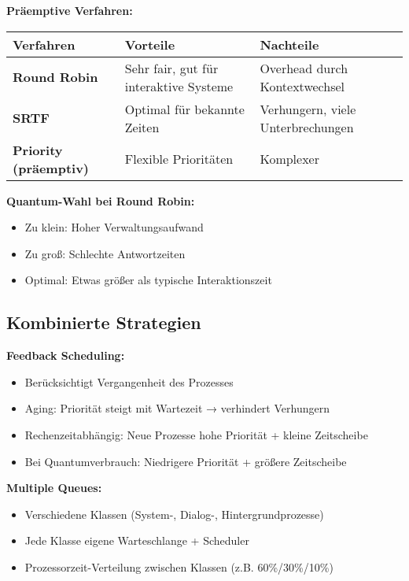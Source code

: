 \documentclass[9pt,a4paper]{extarticle}
\begin{document}
\begin{multicols*}{2}
\textbf{Präemptive Verfahren:}

\begin{center}
\begin{tabular}{|p{2.2cm}|p{2.8cm}|p{2.8cm}|}
\hline
\textbf{Verfahren} & \textbf{Vorteile} & \textbf{Nachteile} \\
\hline
\textbf{Round Robin} & Sehr fair, gut für interaktive Systeme & Overhead durch Kontextwechsel \\
\hline
\textbf{SRTF} & Optimal für bekannte Zeiten & Verhungern, viele Unterbrechungen \\
\hline
\textbf{Priority (präemptiv)} & Flexible Prioritäten & Komplexer \\
\hline
\end{tabular}
\end{center}

\textbf{Quantum-Wahl bei Round Robin:}
\begin{itemize}
\item Zu klein: Hoher Verwaltungsaufwand
\item Zu groß: Schlechte Antwortzeiten
\item Optimal: Etwas größer als typische Interaktionszeit
\end{itemize}

\subsection{Kombinierte Strategien}
\textbf{Feedback Scheduling:}
\begin{itemize}
\item Berücksichtigt Vergangenheit des Prozesses
\item Aging: Priorität steigt mit Wartezeit → verhindert Verhungern
\item Rechenzeitabhängig: Neue Prozesse hohe Priorität + kleine Zeitscheibe
\item Bei Quantumverbrauch: Niedrigere Priorität + größere Zeitscheibe
\end{itemize}

\textbf{Multiple Queues:}
\begin{itemize}
\item Verschiedene Klassen (System-, Dialog-, Hintergrundprozesse)
\item Jede Klasse eigene Warteschlange + Scheduler
\item Prozessorzeit-Verteilung zwischen Klassen (z.B. 60\%/30\%/10\%)
\end{itemize}


\end{multicols*}
\end{document}

